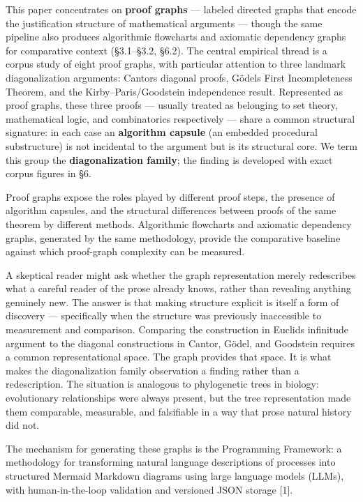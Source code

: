\documentclass[
  11pt]{article}
\begin{document}
This paper concentrates on \textbf{proof graphs} --- labeled directed
graphs that encode the justification structure of mathematical arguments
--- though the same pipeline also produces algorithmic flowcharts and
axiomatic dependency graphs for comparative context (§3.1--§3.2, §6.2).
The central empirical thread is a corpus study of eight proof graphs,
with particular attention to three landmark diagonalization arguments:
Cantor\textquotesingle s diagonal proofs, Gödel\textquotesingle s First
Incompleteness Theorem, and the Kirby--Paris/Goodstein independence
result. Represented as proof graphs, these three proofs --- usually
treated as belonging to set theory, mathematical logic, and
combinatorics respectively --- share a common structural signature: in
each case an \textbf{algorithm capsule} (an embedded procedural
substructure) is not incidental to the argument but is its structural
core. We term this group the \textbf{diagonalization family}; the
finding is developed with exact corpus figures in §6.

Proof graphs expose the roles played by different proof steps, the
presence of algorithm capsules, and the structural differences between
proofs of the same theorem by different methods. Algorithmic flowcharts
and axiomatic dependency graphs, generated by the same methodology,
provide the comparative baseline against which proof-graph complexity
can be measured.

A skeptical reader might ask whether the graph representation merely
redescribes what a careful reader of the prose already knows, rather
than revealing anything genuinely new. The answer is that making
structure explicit is itself a form of discovery --- specifically when
the structure was previously inaccessible to measurement and comparison.
Comparing the construction in Euclid\textquotesingle s infinitude
argument to the diagonal constructions in Cantor, Gödel, and Goodstein
requires a common representational space. The graph provides that space.
It is what makes the diagonalization family observation a finding rather
than a redescription. The situation is analogous to phylogenetic trees
in biology: evolutionary relationships were always present, but the tree
representation made them comparable, measurable, and falsifiable in a
way that prose natural history did not.

The mechanism for generating these graphs is the Programming Framework:
a methodology for transforming natural language descriptions of
processes into structured Mermaid Markdown diagrams using large language
models (LLMs), with human-in-the-loop validation and versioned JSON
storage {[}1{]}.
\end{document}
